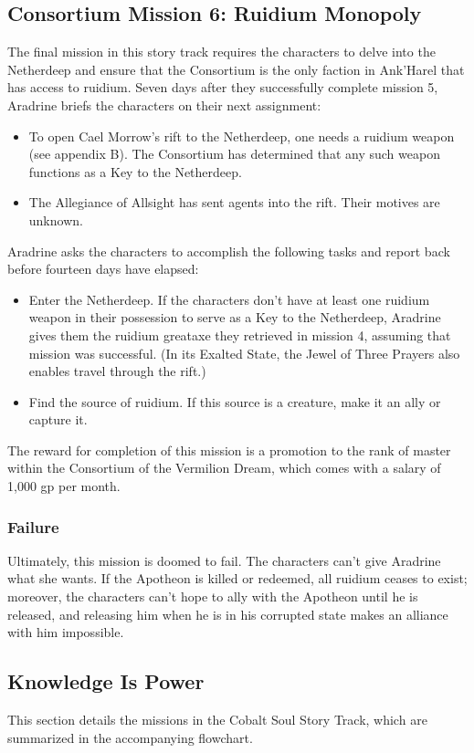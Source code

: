 \documentclass[10pt,a4,twoside,twocolumn,openany,nodeprecatedcode]{dndbook}
\begin{document}
\subsection{Consortium Mission 6: Ruidium Monopoly}
The final mission in this story track requires the characters to delve into the Netherdeep and ensure that the Consortium is the only faction in Ank'Harel that has access to ruidium.
Seven days after they successfully complete mission 5, Aradrine briefs the characters on their next assignment:
\begin{itemize}

\item To open Cael Morrow's rift to the Netherdeep, one needs a ruidium weapon (see appendix B). The Consortium has determined that any such weapon functions as a Key to the Netherdeep.
\item The Allegiance of Allsight has sent agents into the rift. Their motives are unknown.
\end{itemize}


Aradrine asks the characters to accomplish the following tasks and report back before fourteen days have elapsed:
\begin{itemize}

\item Enter the Netherdeep. If the characters don't have at least one ruidium weapon in their possession to serve as a Key to the Netherdeep, Aradrine gives them the ruidium greataxe they retrieved in mission 4, assuming that mission was successful. (In its Exalted State, the Jewel of Three Prayers also enables travel through the rift.)
\item Find the source of ruidium. If this source is a creature, make it an ally or capture it.
\end{itemize}


The reward for completion of this mission is a promotion to the rank of master within the Consortium of the Vermilion Dream, which comes with a salary of 1,000 gp per month.
\subsubsection{Failure}
Ultimately, this mission is doomed to fail. The characters can't give Aradrine what she wants. If the Apotheon is killed or redeemed, all ruidium ceases to exist; moreover, the characters can't hope to ally with the Apotheon until he is released, and releasing him when he is in his corrupted state makes an alliance with him impossible.
\subsection{Knowledge Is Power}
This section details the missions in the Cobalt Soul Story Track, which are summarized in the accompanying flowchart.
\end{document}
